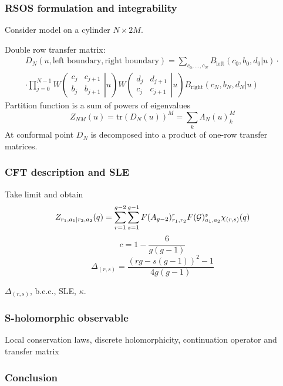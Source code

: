\documentclass[pdftex]{beamer}
\theoremstyle{definition} \newtheorem{Def}{Definition}
\begin{document}
   \begin{frame}
     \frametitle{RSOS formulation and integrability}
     Consider model on a cylinder $N\times 2M$. 

     Double row transfer matrix:
     \begin{multline}
       \label{eq:5}
       D_N(u,\mbox{left boundary},\mbox{right boundary})=\sum_{c_0,\dots,c_N} B_{\mathrm{left}}(c_0,b_0,d_0| u)\cdot\\
       \cdot\prod_{j=0}^{N-1} W \left(\left.\begin{array}{cc} c_j & c_{j+1} \\ b_j & b_{j+1} \end{array}\right| u\right) 
       W \left(\left.\begin{array}{cc} d_j & d_{j+1} \\ c_j & c_{j+1} \end{array}\right| u\right) B_{\mathrm{right}} (c_N, b_N, d_N|u)
     \end{multline}
     Partition function is a sum of powers of eigenvalues
     \begin{equation}
       \label{eq:9}
       Z_{NM}(u)=\mathrm{tr} (D_N(u))^M=\sum_k \Lambda_N(u)_k ^M
     \end{equation}
     At conformal point $D_N$ is decomposed into a product of one-row transfer matrices. 

   \end{frame}
  \begin{frame}
    \frametitle{ CFT description and SLE }
    Take limit and obtain
     \begin{equation}
       \label{eq:10}
       Z_{r_1,a_1|r_2,a_2}(q) = \sum_{r=1}^{g-2} \sum_{s=1}^{g-1} F(A_{g-2})_{r_1,r_2}^r F({\cal G})_{a_1,a_2}^s \chi_{(r,s)}(q)
     \end{equation}
     \begin{equation}
       \label{eq:11}
       c=1-\frac{6}{g(g-1)}
     \end{equation}
     \begin{equation}
       \label{eq:13}
       \Delta_{(r,s)}=\frac{(rg-s(g-1))^2-1}{4g(g-1)}
     \end{equation}

     $\Delta_{(r,s)}$, b.c.c., SLE, $\kappa$. 
  \end{frame}
  \begin{frame}
    \frametitle{ S-holomorphic observable}
    Local conservation laws, discrete holomorphicity, continuation operator and transfer matrix
  \end{frame}
  \begin{frame}
    \frametitle{ Conclusion}
  \end{frame}
{} 
  
\end{document}

